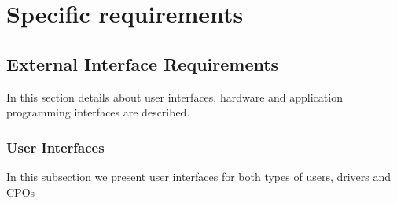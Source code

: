 \section{Specific requirements}

\subsection{External Interface Requirements}
In this section details about user interfaces, hardware and application programming interfaces are described.

\subsubsection{User Interfaces}
In this subsection we present user interfaces for both types of users, drivers and CPOs

